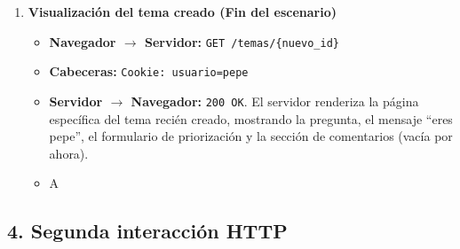 \begin{enumerate}
  \item \textbf{Visualización del tema creado (Fin del escenario)}
  \begin{itemize}
    \item \textbf{Navegador $\rightarrow$ Servidor:} \texttt{GET /temas/\{nuevo\_id\}}
    \item \textbf{Cabeceras:} \texttt{Cookie: usuario=pepe}
    \item \textbf{Servidor $\rightarrow$ Navegador:} \texttt{200 OK}. El servidor renderiza la página específica del tema recién creado, mostrando la pregunta, el mensaje ``eres pepe'', el formulario de priorización y la sección de comentarios (vacía por ahora).
    \item \textcircled{A}
  \end{itemize}
\end{enumerate}

\subsection*{4. Segunda interacción HTTP}

